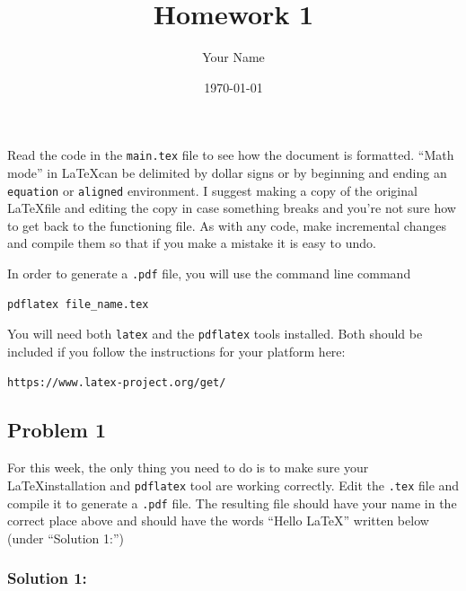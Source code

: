 \documentclass{article}
\title{Homework 1}
\author{Your Name}
\date\today
\begin{document}
\maketitle %

Read the code in the \texttt{main.tex} file to see how the document is formatted. ``Math mode'' in \LaTeX  can be delimited by dollar signs or by beginning and ending an \texttt{equation} or \texttt{aligned} environment. I suggest making a copy of the original \LaTeX file and editing the copy in case something breaks and you're not sure how to get back to the functioning file. As with any code, make incremental changes and compile them so that if you make a mistake it is easy to undo.

In order to generate a \texttt{.pdf} file, you will use the command line command

\begin{verbatim}
pdflatex file_name.tex
\end{verbatim}

You will need both \texttt{latex} and the \texttt{pdflatex} tools installed. Both should be included if you follow the instructions for your platform here:

\begin{verbatim}
https://www.latex-project.org/get/
\end{verbatim}

\subsection*{Problem 1}

For this week, the only thing you need to do is to make sure your \LaTeX installation and \texttt{pdflatex} tool are working correctly. Edit the \texttt{.tex} file and compile it to generate a \texttt{.pdf} file. The resulting file should have your name in the correct place above and should have the words ``Hello \LaTeX'' written below (under ``Solution 1:'')

\subsubsection*{Solution 1:}
\end{document}
